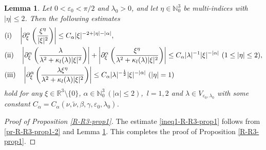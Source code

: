 \documentclass[dvipdfmx,12pt]{article}
\newtheorem{lem}[dfn]{Lemma}
\begin{document}
\begin{lem}\label{R-R3-lem2}
Let $0<\varepsilon_0<\pi/2$ and $\lambda_0>0$, and let $\eta\in\mathbb{N}_0^3$ be multi-indices with $|\eta|\le 2$. Then the following estimates 
\begin{align*}
&
{\rm (i)}\quad \left|\partial_\xi^\alpha\left(\frac{\xi^{\eta}}{|\xi|^2}\right)\right|\le C_\alpha|\xi|^{-2+|\eta|-|\alpha|},
\\
&{\rm (ii)}\quad \left|\partial_\xi^\alpha\left(\frac{\lambda}{\lambda^2+\kappa_l(\lambda)|\xi|^2}\right)\right|+\left|\partial_\xi^\alpha\left(\frac{\xi^\eta}{\lambda^2+\kappa_l(\lambda)|\xi|^2}\right)\right|\leq C_\alpha|\lambda|^{-1} |\xi|^{-|\alpha|}~(1\le |\eta|\le 2),\\
&{\rm (iii)}\quad \left|\partial_\xi^\alpha\left(\frac{\lambda \xi^{\eta}}{\lambda^2+\kappa_l(\lambda)|\xi|^2}\right)\right|\leq C_\alpha|\lambda|^{-\frac{1}{2}} |\xi|^{-|\alpha|}~(|\eta|=1)
\end{align*}
hold for any $\xi\in\mathbb{R}^3\setminus\{0\}$, $\alpha\in \mathbb{N}_0^3~(|\alpha|\le 2)$,~$l=1,2$ and $\lambda\in V_{\varepsilon_0,\lambda_0}$ with some constant $C_\alpha=C_\alpha(\nu,\tilde{\nu},\beta,\gamma,\varepsilon_0,\lambda_0)$.
\end{lem}
\begin{proof}[Proof of Proposition \ref{R-R3-prop1}]
The estimate \eqref{ineq1-R-R3-prop1} follows from \eqref{pr-R-R3-prop1-2} and Lemma \ref{R-R3-lem2}. This completes the proof of Proposition \ref{R-R3-prop1}.
\end{proof}

\vskip2mm
\end{document}
